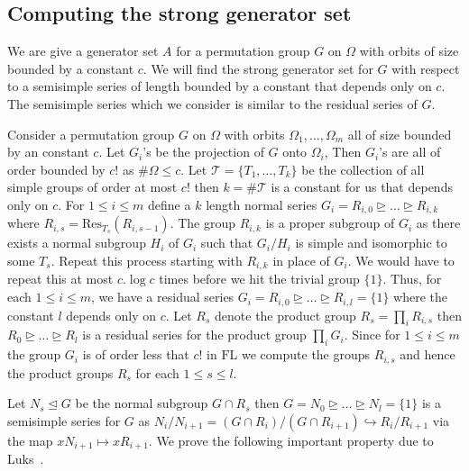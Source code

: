 \documentclass[11pt]{madras}%
\theoremstyle{remark}
\newcommand{\Residue}[2][]{{\ensuremath{\mathrm{Res}_{{#1}}\left(#2\right)}}}
\begin{document}
\subsection{Computing the strong generator set}%
\label{subsect-compute-sgs}

We are give a generator set $A$ for a permutation group $G$ on
$\Omega$ with orbits of size bounded by a constant $c$. We will find
the strong generator set for $G$ with respect to a semisimple series
of length bounded by a constant that depends only on $c$.  The
semisimple series which we consider is similar to the residual series
of $G$. 

Consider a permutation group $G$ on $\Omega$ with orbits $\Omega_1,
\ldots, \Omega_m$ all of size bounded by an constant $c$.  Let $G_i$'s
be the projection of $G$ onto $\Omega_i$, Then $G_i$'s are all of
order bounded by $c!$ as $\# \Omega \leq c$. Let $\mathcal{T} = \{
T_1,\ldots,T_k\}$ be the collection of all simple groups of order at
most $c!$ then $k = \# \mathcal{T}$ is a constant for us that depends
only on $c$. For $1 \leq i \leq m$ define a $k$ length normal series
$G_i = R_{i,0} \unrhd \ldots \unrhd R_{i,k}$ where $R_{i,s} =
\Residue[T_s]{R_{i,s-1}}$. The group $R_{i,k}$ is a proper subgroup of
$G_i$ as there exists a normal subgroup $H_i$ of $G_i$ such that
$G_i/H_i$ is simple and isomorphic to some $T_s$.  Repeat this process
starting with $R_{i,k}$ in place of $G_i$. We would have to repeat
this at most $c . \log{c}$ times before we hit the trivial group $\{ 1
\}$. Thus, for each $1 \leq i \leq m$, we have a residual series $G_i
= R_{i,0} \unrhd \ldots \unrhd R_{i,l} = \{ 1 \}$ where the constant
$l$ depends only on $c$. Let $R_s$ denote the product group $R_s =
\prod_i R_{i,s}$ then $R_0 \unrhd \ldots \unrhd R_l$ is a residual
series for the product group $\prod_i G_i$.  Since for $1 \leq i \leq
m$ the group $G_i$ is of order less that $c!$ in $\mathrm{FL}$ we
compute the groups $R_{i,s}$ and hence the product groups $R_s$ for
each $1 \leq s \leq l$.

Let $N_s \unlhd G$ be the normal subgroup $G \cap R_s$ then $G = N_0
\unrhd \ldots \unrhd N_l = \{ 1 \}$ is a semisimple series for $G$ as
$N_i/N_{i+1} = (G\cap R_i)/(G \cap R_{i+1}) \hookrightarrow
R_i/R_{i+1}$ via the map $x N_{i+1} \mapsto x R_{i+1}$. We prove the
following important property due to Luks~\cite[Lemma
6.4]{luks86parallel}.
\end{document}
